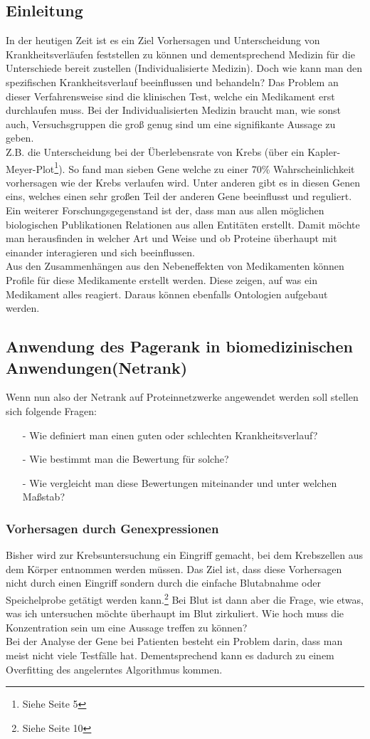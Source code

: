 \documentclass{article}
\begin{document}
\subsection{Einleitung}
In der heutigen Zeit ist es ein Ziel Vorhersagen und Unterscheidung von Krankheitsverläufen feststellen zu können und dementsprechend Medizin für die Unterschiede bereit zustellen (Individualisierte Medizin). Doch wie kann man den spezifischen Krankheitsverlauf beeinflussen und behandeln? Das Problem an dieser Verfahrensweise sind die klinischen Test, welche ein Medikament erst durchlaufen muss. Bei der Individualisierten Medizin braucht man, wie sonst auch, Versuchsgruppen die groß genug sind um eine signifikante Aussage zu geben.\\
Z.B. die Unterscheidung bei der Überlebensrate von Krebs (über ein Kapler-Meyer-Plot\footnote{Siehe Seite 5}). So fand man sieben Gene welche zu einer 70\% Wahrscheinlichkeit vorhersagen wie der Krebs verlaufen wird. Unter anderen gibt es in diesen Genen eins, welches einen sehr großen Teil der anderen Gene beeinflusst und reguliert.\\
Ein weiterer Forschungsgegenstand ist der, dass man aus allen möglichen biologischen Publikationen Relationen aus allen Entitäten erstellt. Damit möchte man herausfinden in welcher Art und Weise und ob Proteine überhaupt mit einander interagieren und sich beeinflussen.\\
Aus den Zusammenhängen aus den Nebeneffekten von Medikamenten können Profile für diese Medikamente erstellt werden. Diese zeigen, auf was ein Medikament alles reagiert. Daraus können ebenfalls Ontologien aufgebaut werden.
\subsection{Anwendung des Pagerank in biomedizinischen Anwendungen(Netrank)}
Wenn nun also der Netrank auf Proteinnetzwerke angewendet werden soll stellen sich folgende Fragen:
\begin{itemize}
\item[-] Wie definiert man einen guten oder schlechten Krankheitsverlauf?
\item[-] Wie bestimmt man die Bewertung für solche?
\item[-] Wie vergleicht man diese Bewertungen miteinander und unter welchen Maßstab?
\end{itemize}
\subsubsection{Vorhersagen durch Genexpressionen}
Bisher wird zur Krebsuntersuchung ein Eingriff gemacht, bei dem Krebszellen aus dem Körper entnommen werden müssen. Das Ziel ist, dass diese Vorhersagen nicht durch einen Eingriff sondern durch die einfache Blutabnahme oder Speichelprobe getätigt werden kann.\footnote{Siehe Seite 10} Bei Blut ist dann aber die Frage, wie etwas, was ich untersuchen möchte überhaupt im Blut zirkuliert. Wie hoch muss die Konzentration sein um eine Aussage treffen zu können?\\
Bei der Analyse der Gene bei Patienten besteht ein Problem darin, dass man meist nicht viele Testfälle hat. Dementsprechend kann es dadurch zu einem Overfitting des angelerntes Algorithmus kommen.
\end{document}

